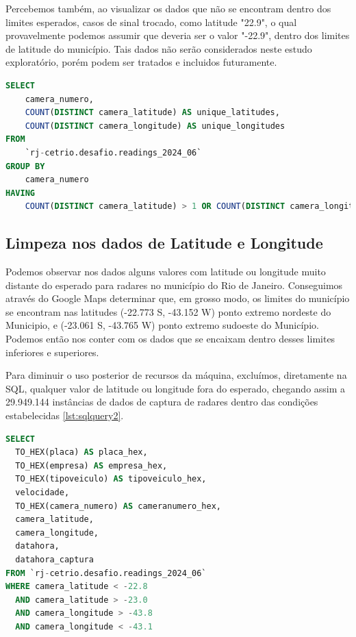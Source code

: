 \documentclass{article}
\begin{document}
Percebemos também, ao visualizar os dados que não se encontram dentro dos limites esperados, casos de sinal trocado, como latitude "22.9", o qual provavelmente podemos assumir que deveria ser o valor "-22.9", dentro dos limites de latitude do município. Tais dados não serão considerados neste estudo exploratório, porém podem ser tratados e incluidos futuramente.

\begin{lstlisting}[language=SQL,caption={Query SQL para identificar se existem casos inconsistentes onde registros feitos pela mesma câmera de radar apresentam valores diferentes de latitude e longitude entre si. Não existem.},label={lst:sqlquery2}]
SELECT 
    camera_numero, 
    COUNT(DISTINCT camera_latitude) AS unique_latitudes,
    COUNT(DISTINCT camera_longitude) AS unique_longitudes
FROM 
    `rj-cetrio.desafio.readings_2024_06`
GROUP BY
    camera_numero
HAVING 
    COUNT(DISTINCT camera_latitude) > 1 OR COUNT(DISTINCT camera_longitude) > 1;
\end{lstlisting}

\subsection{Limpeza nos dados de Latitude e Longitude}

Podemos observar nos dados alguns valores com latitude ou longitude muito distante do esperado para radares no município do Rio de Janeiro. Conseguimos através do Google Maps determinar que, em grosso modo, os limites do município se encontram nas latitudes (-22.773 S, -43.152 W) ponto extremo nordeste do Municipio, e (-23.061 S, -43.765 W) ponto extremo sudoeste do Município. Podemos então nos conter com os dados que se encaixam dentro desses limites inferiores e superiores.

Para diminuir o uso posterior de recursos da máquina, excluímos, diretamente na SQL, qualquer valor de latitude ou longitude fora do esperado, chegando assim a 29.949.144 instâncias  de  dados  de  captura  de  radares  dentro  das  condições  estabelecidas \ref{lst:sqlquery2}.

\begin{lstlisting}[language=SQL,caption={Query SQL para recuperar dados de radares dentro de um modelo retângular do Município do Rio de Janeiro},label={lst:sqlquery2}]
SELECT
  TO_HEX(placa) AS placa_hex,
  TO_HEX(empresa) AS empresa_hex,
  TO_HEX(tipoveiculo) AS tipoveiculo_hex,
  velocidade,
  TO_HEX(camera_numero) AS cameranumero_hex,
  camera_latitude,
  camera_longitude,
  datahora,
  datahora_captura
FROM `rj-cetrio.desafio.readings_2024_06`
WHERE camera_latitude < -22.8
  AND camera_latitude > -23.0
  AND camera_longitude > -43.8
  AND camera_longitude < -43.1
\end{lstlisting}
\end{document}
